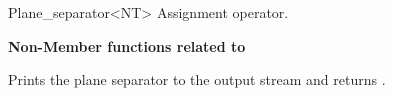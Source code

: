 \begin{ccRefClass}{Plane_separator<NT>}
{Assignment operator.}

\begin{ccAdvanced}

{\bf Non-Member functions related to }

\ccGlueBegin
{}
{Prints the plane separator  to the output stream  and returns .}
\ccGlueEnd

\end{ccAdvanced}

\end{ccRefClass}


